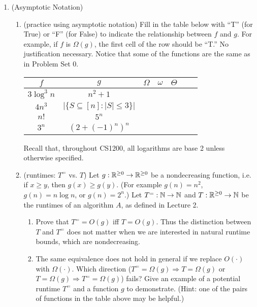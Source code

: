 \documentclass[11pt]{article}
\begin{document}
\begin{enumerate}
    \item (Asymptotic Notation) 
    \begin{enumerate}
    \item (practice using asymptotic notation)
        Fill in the table below with ``T'' (for True) or ``F'' (for False) to indicate the relationship between $f$ and $g$. For example, if $f$ is $\Omega(g)$, the first cell of the row should be ``T.''   No justification necessary.  Notice that some of the functions are the same as in Problem Set 0.\\
        \begin{table}[h!]
        \centering
        \bgroup
        \def\arraystretch{1.3}
        \begin{tabular}{||c | c || c | c | c | c | c ||}
         \hline
         $f$ & $g$ & $\Omega$ & $\omega$ & $\Theta$ \\
         \hline\hline
         $3\log ^3 n$ & $n^2+1$ & & & \\ \hline
         $4n^3$ & $\left| \{S \subseteq [n] : |S|\leq 3\}\right|$ & & &  \\ \hline
         $n!$ & $5^n$ & & & \\ \hline
         $3^n$ & $\left(2+(-1)^n\right)^n$ & & & \\ \hline
        \end{tabular}
        \egroup
        \end{table}
        Recall that, throughout CS1200, all logarithms are base 2 unless otherwise specified. 
        
    \item  (runtimes: $T^=$ vs. $T$)  
    Let $g : \mathbb{R}^{\geq 0}\rightarrow \mathbb{R}^{\geq 0}$ be a nondecreasing function, i.e. if $x\geq y$, then $g(x)\geq g(y)$. (For example $g(n)=n^2$, $g(n)=n\log n$, or $g(n)=2^n$.) Let $T^{=} : \mathbb{N}\rightarrow \mathbb{N}$ and $T : \mathbb{R}^{\geq 0}\rightarrow \mathbb{N}$ be the runtimes of an algorithm $A$, as defined in Lecture 2. 
    \begin{enumerate}   
    \item Prove that $T^{=}=O(g)$ iff $T=O(g)$. Thus the distinction between $T$ and $T^{=}$ does not matter when we are interested in natural runtime bounds, which are nondecreasing. 

    \item The same equivalence does not hold in general if we replace $O(\cdot)$ with $\Omega(\cdot)$.  Which direction ($T^{=}=\Omega(g) \Rightarrow T=\Omega(g)$ or $T=\Omega(g) \Rightarrow T^{=}=\Omega(g)$) fails? Give an example of a potential runtime $T^{=}$ and a function $g$ to demonstrate.  (Hint: one of the pairs of functions in the table above may be helpful.)
    \end{enumerate}


\end{enumerate}
\end{enumerate}
\end{document}

